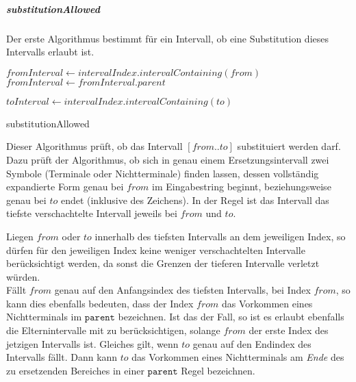 \subparagraph{substitutionAllowed}

Der erste Algorithmus bestimmt für ein Intervall, ob eine Substitution dieses Intervalls erlaubt ist. 

\begin{algorithm}
    $fromInterval \leftarrow intervalIndex.intervalContaining(from)$\;
     {
        $fromInterval \leftarrow fromInterval.parent$\;
    }

     {
    }

    $toInterval \leftarrow intervalIndex.intervalContaining(to)$\;
    
    \caption{substitutionAllowed}
\end{algorithm}
Dieser Algorithmus prüft, ob das Intervall $[from..to]$ substituiert werden darf. Dazu prüft der Algorithmus, ob sich in genau einem Ersetzungsintervall zwei Symbole (Terminale oder Nichtterminale) finden lassen, dessen vollständig expandierte Form genau bei $from$ im Eingabestring beginnt, beziehungsweise genau bei $to$ endet (inklusive des Zeichens).
In der Regel ist das Intervall das tiefste verschachtelte Intervall jeweils bei $from$ und $to$. 

Liegen $from$ oder $to$ innerhalb des tiefsten Intervalls an dem jeweiligen Index, so dürfen für den jeweiligen Index keine weniger verschachtelten Intervalle berücksichtigt werden, da sonst die Grenzen der tieferen Intervalle verletzt würden.\\ 
Fällt $from$ genau auf den Anfangsindex des tiefsten Intervalls, bei Index $from$, so kann dies ebenfalls bedeuten, dass der Index $from$ das Vorkommen eines Nichtterminals im $\texttt{parent}$ bezeichnen. Ist das der Fall, so ist es erlaubt ebenfalls die Elternintervalle mit zu berücksichtigen, solange $from$ der erste Index des jetzigen Intervalls ist. Gleiches gilt, wenn $to$ genau auf den Endindex des Intervalls fällt. Dann kann $to$ das Vorkommen eines Nichtterminals am \emph{Ende} des zu ersetzenden Bereiches in einer $\texttt{parent}$ Regel bezeichnen.

